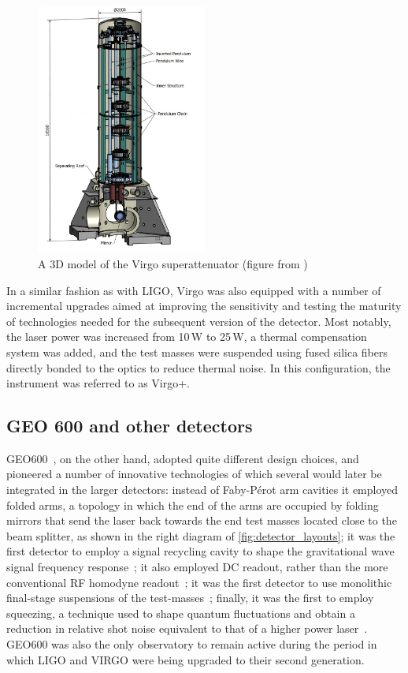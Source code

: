 \begin{figure}
	\centering
	\includegraphics[width=0.5\textwidth]{superattenuator.jpg}
	\caption{\label{fig:superattenuator}
		A 3D model of the Virgo superattenuator (figure from \cite{Accadia_2012})}
\end{figure}

In a similar fashion as with LIGO, Virgo was also equipped with a number of incremental upgrades aimed at improving the sensitivity and testing the maturity of technologies needed for the subsequent version of the detector.
Most notably, the laser power was increased from 10\,W to 25\,W, a thermal compensation system was added, and the test masses were suspended using fused silica fibers directly bonded to the optics to reduce thermal noise\cite{Lorenzini_2010}.
In this configuration, the instrument was referred to as Virgo+.

\subsection{GEO 600 and other detectors}
GEO600~\cite{Grote_2010}, on the other hand, adopted quite different design choices, and pioneered a number of innovative technologies of which several would later be integrated in the larger detectors:
instead of Faby-P\'{e}rot arm cavities it employed folded arms, a topology in which the end of the arms are occupied by folding mirrors that send the laser back towards the end test masses located close to the beam splitter, as shown in the right diagram of \autoref{fig:detector_layouts};
it was the first detector to employ a signal recycling cavity to shape the gravitational wave signal frequency response~\cite{Willke_2002};
it also employed DC readout, rather than the more conventional RF homodyne readout~\cite{DCreadout};
it was the first detector to use monolithic final-stage suspensions of the test-masses~\cite{Plissi_2000};
finally, it was the first to employ squeezing, a technique used to shape quantum fluctuations and obtain a reduction in relative shot noise equivalent to that of a higher power laser~\cite{Grote_2013}.
GEO600 was also the only observatory to remain active during the period in which LIGO and VIRGO were being upgraded to their second generation.

